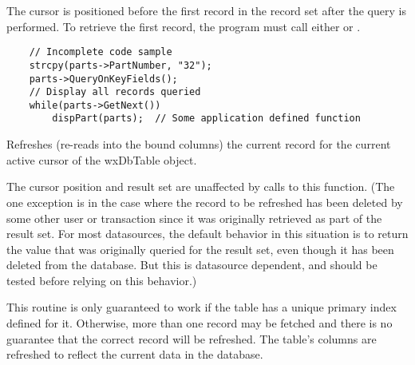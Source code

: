 


The cursor is positioned before the first record in the record set after 
the query is performed.  To retrieve the first record, the program must call 
either  or 
.


\begin{verbatim}
    // Incomplete code sample
    strcpy(parts->PartNumber, "32");
    parts->QueryOnKeyFields();
    // Display all records queried
    while(parts->GetNext())
        dispPart(parts);  // Some application defined function
\end{verbatim}


\label{wxdbtablerefresh}


Refreshes (re-reads into the bound columns) the current record for the 
current active cursor of the wxDbTable object.  

The cursor position and result set are unaffected by calls to this function.
(The one exception is in the case where the record to be refreshed has been 
deleted by some other user or transaction since it was originally retrieved 
as part of the result set.  For most datasources, the default behavior in 
this situation is to return the value that was originally queried for the 
result set, even though it has been deleted from the database.  But this is 
datasource dependent, and should be tested before relying on this behavior.)


This routine is only guaranteed to work if the table has a unique primary 
index defined for it.  Otherwise, more than one record may be fetched and 
there is no guarantee that the correct record will be refreshed.  The 
table's columns are refreshed to reflect the current data in the database.


